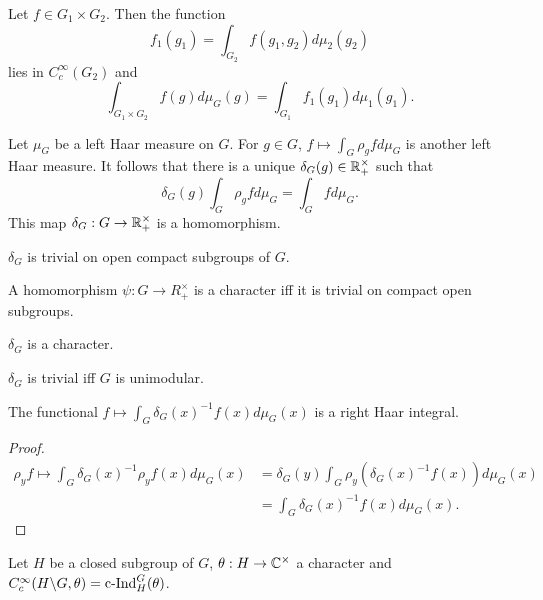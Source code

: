 \documentclass{memoir}
\begin{document}
\begin{proposition}
    Let $f\in G_1\times G_2$.
    Then the function
    \begin{equation}
        f_1(g_1) = \int_{G_2}f(g_1,g_2)d\mu_2(g_2)
    \end{equation}
    lies in $C_c^\infty(G_2)$ and 
    \begin{equation}
        \int_{G_1\times G_2} f(g) d\mu_G(g) = \int_{G_1}f_1(g_1)d\mu_1(g_1).
    \end{equation}
\end{proposition}
\begin{definition}
    Let $\mu_G$ be a left Haar measure on $G$.
    For $g\in G$, $f\mapsto \int_G\rho_gfd\mu_G$ is another left Haar measure.
    It follows that there is a unique $\delta_G(g)\in \mathbb{R}_+^\times$ such that 
    \begin{equation}
        \delta_G(g) \int_G\rho_gfd\mu_G = \int_Gfd\mu_G.
    \end{equation}
    This map $\delta_G:G\to \mathbb{R}_+^\times$ is a homomorphism.
\end{definition}
\begin{proposition}
    $\delta_G$ is trivial on open compact subgroups of $G$.
\end{proposition}
\begin{proposition}
    A homomorphism $\psi:G\to R_+^\times$ is a character iff it is trivial on compact open subgroups.
\end{proposition}
\begin{corollary}
    $\delta_G$ is a character.
\end{corollary}
\begin{proposition}
    $\delta_G$ is trivial iff $G$ is unimodular.
\end{proposition}
\begin{proposition}
    The functional $f\mapsto \int_G\delta_G(x)^{-1}f(x)d\mu_G(x)$ is a right Haar integral.
\end{proposition}
\begin{proof}
    \begin{align}
        \rho_yf\mapsto \int_G\delta_G(x)^{-1}\rho_yf(x)d\mu_G(x) &= \delta_G(y)\int_G\rho_y(\delta_G(x)^{-1}f(x))d\mu_G(x) \nonumber \\
                                                                 &= \int_G\delta_G(x)^{-1}f(x)d\mu_G(x).
    \end{align}
\end{proof}
\begin{definition}
    Let $H$ be a closed subgroup of $G$, $\theta:H\to \mathbb{C}^\times$ a character and $C_c^\infty(H\backslash G,\theta) = \text{c-Ind}_H^G(\theta)$.
\end{definition}
\end{document}
